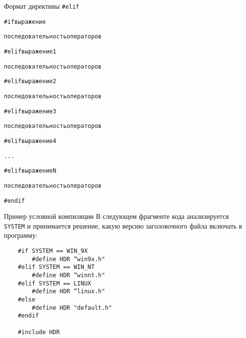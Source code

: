 \documentclass{beamer}
\begin{document}
\begin{frame}{Формат директивы \texttt{\#elif}}
    \begin{alltt}
        \#if выражение
        
        \qquad последовательность операторов
        
        \#elif выражение 1
        
        \qquad последовательность операторов
        
        \#elif выражение 2
        
        \qquad последовательность операторов
        
        \#elif выражение 3
        
        \qquad последовательность операторов
        
        \#elif выражение 4
        
        . . .
        
        \#elif выражение N
        
        \qquad последовательность операторов
        
        \#endif
    \end{alltt}
\end{frame}

\begin{frame}[fragile]{Пример условной компиляции}
    В следующем фрагменте кода анализируется \texttt{SYSTEM} и принимается решение, какую версию заголовочного файла включать в программу:
    
    \begin{verbatim}
    #if SYSTEM == WIN_9X
        #define HDR “win9x.h"
    #elif SYSTEM == WIN_NT
        #define HDR “winnt.h"
    #elif SYSTEM == LINUX
        #define HDR “linux.h"
    #else
        #define HDR "default.h"
    #endif
    
    #include HDR
    \end{verbatim}
\end{frame}
\end{document}
